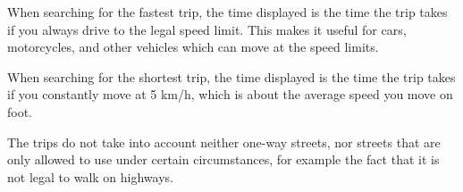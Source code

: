 When searching for the fastest trip, the time displayed is the time the trip takes if you always drive to the legal speed limit. This makes it useful for cars, motorcycles, and other vehicles which can move at the speed limits.

When searching for the shortest trip, the time displayed is the time the trip takes if you constantly move at 5 km/h, which is about the average speed you move on foot.

The trips do not take into account neither one-way streets, nor streets that are only allowed to use under certain circumstances, for example the fact that it is not legal to walk on highways.
